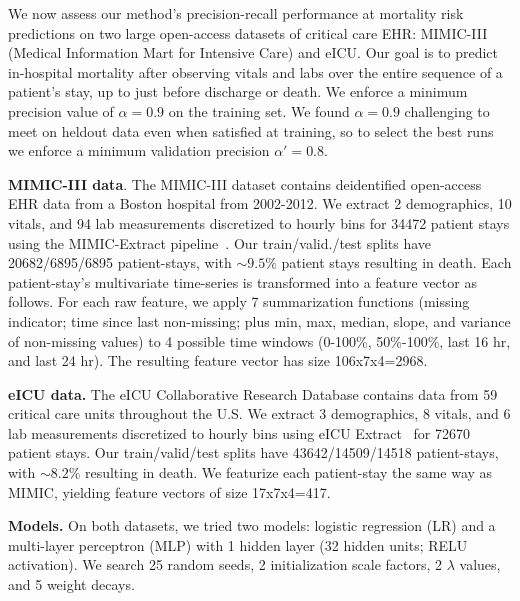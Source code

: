 We now assess our method's precision-recall performance at mortality risk predictions on two large open-access datasets of critical care EHR: MIMIC-III (Medical Information Mart for Intensive Care) and eICU.
Our goal is to predict in-hospital mortality after observing vitals and labs over the entire sequence of a patient's stay, up to just before discharge or death.
We enforce a minimum precision value of $\alpha = 0.9$ on the training set.
We found $\alpha=0.9$ challenging to meet on heldout data even when satisfied at training, so to select the best runs we enforce a minimum validation precision $\alpha' = 0.8$.

\textbf{MIMIC-III data}. The MIMIC-III dataset \citep{johnsonMIMICIIIFreelyAccessible2016} contains deidentified open-access EHR data from a Boston hospital from 2002-2012. We extract 2 demographics, 10 vitals, and 94 lab measurements discretized to hourly bins for 34472 patient stays using the MIMIC-Extract pipeline~\citep{wangMIMICExtractDataExtraction2020}.  
Our train/valid./test splits have 20682/6895/6895 patient-stays, with $\sim 9.5\%$ patient stays resulting in death. 
Each patient-stay's multivariate time-series is transformed into a feature vector as follows. For each raw feature, we apply 7 summarization functions (missing indicator; time since last non-missing; plus min, max, median, slope, and variance of non-missing values) to 4 possible time windows 
(0-100\%, 50\%-100\%, last 16 hr, and last 24 hr). 
The resulting feature vector has size 106x7x4=2968.

\textbf{eICU data.}
The eICU Collaborative Research Database \citep{pollard2018eicu} contains data from 59 critical care units throughout the U.S. We extract 3 demographics, 8 vitals, and 6 lab measurements discretized to hourly bins using eICU Extract~\citep{eICUExtract} for 72670 patient stays.
Our train/valid/test splits have 43642/14509/14518 patient-stays, with $\sim 8.2\%$ resulting in death.
We featurize each patient-stay the same way as MIMIC, yielding feature vectors of size 17x7x4=417.

\textbf{Models.}
On both datasets, we tried two models: logistic regression (LR) and a multi-layer perceptron (MLP) with 1 hidden layer (32 hidden units; RELU activation).
We search 25 random seeds, 2 initialization scale factors, 2 $\lambda$ values, and 5 weight decays.

